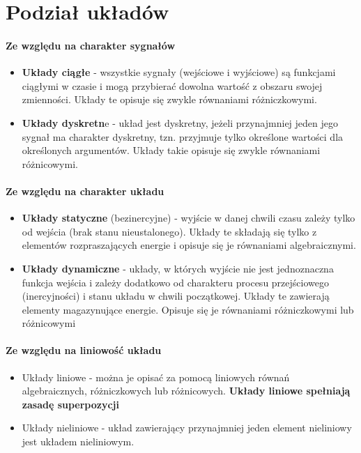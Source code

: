 \documentclass[a4paper,twoside]{report}
\begin{document}
\section{Podział układów}
\paragraph{Ze względu na charakter sygnałów}
\begin{itemize}
	\item \textbf{Układy ciągłe }- wszystkie sygnały (wejściowe i wyjściowe) są funkcjami ciągłymi w czasie i mogą
	przybierać dowolna wartość z obszaru swojej zmienności. Układy te opisuje się zwykle równaniami różniczkowymi.
	\item \textbf{Układy dyskretn}e - układ jest dyskretny, jeżeli przynajmniej jeden jego sygnał ma charakter dyskretny,
	tzn. przyjmuje tylko określone wartości dla określonych argumentów. Układy takie opisuje się zwykle równaniami
	różnicowymi.
\end{itemize}
\paragraph{Ze względu na charakter układu}
\begin{itemize}
	\item \textbf{Układy statyczne} (bezinercyjne) - wyjście w
	danej chwili czasu zależy tylko od wejścia (brak
	stanu nieustalonego). Układy te składają się
	tylko z elementów rozpraszających energie i
	opisuje się je równaniami algebraicznymi.
	\item \textbf{Układy dynamiczne} - układy, w których wyjście
	nie jest jednoznaczna funkcja wejścia i zależy
	dodatkowo od charakteru procesu
	przejściowego (inercyjności) i stanu układu w
	chwili początkowej. Układy te zawierają
	elementy magazynujące energie. Opisuje się je
	równaniami różniczkowymi lub różnicowymi
\end{itemize}  
\paragraph{Ze względu na liniowość układu}
\begin{itemize}
	\item Układy liniowe - można je opisać za pomocą liniowych równań
	algebraicznych, różniczkowych lub różnicowych.
	\textbf{Układy liniowe spełniają zasadę superpozycji}
	\item Układy nieliniowe - układ zawierający przynajmniej jeden element
	nieliniowy jest układem nieliniowym.
\end{itemize}
\end{document}
